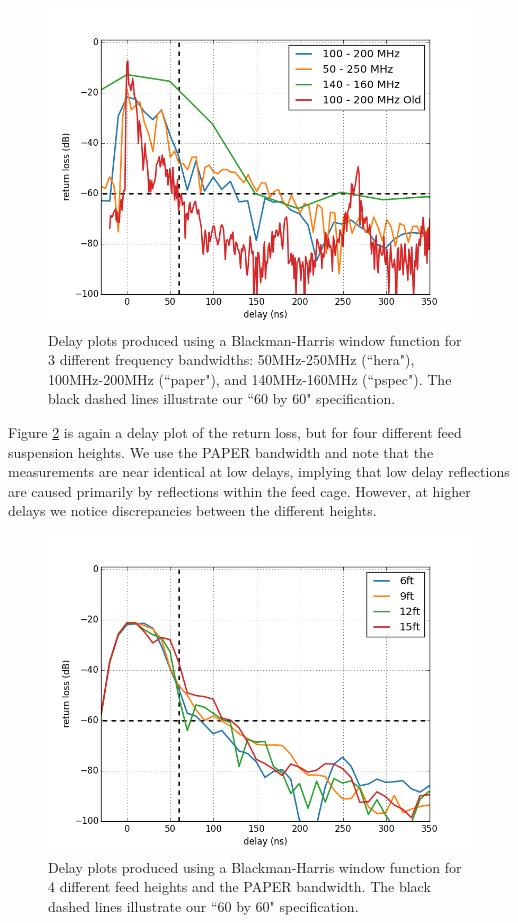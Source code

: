 \documentclass[12pt,preprint]{aastex}
\begin{document}
\begin{figure}
\centering
\includegraphics[totalheight=0.4\textheight]{plots/delay3_window.png}
\caption{Delay plots produced using a Blackman-Harris window function for 3 different frequency bandwidths: 50MHz-250MHz (``hera"), 100MHz-200MHz (``paper"), and 140MHz-160MHz (``pspec"). The black dashed lines illustrate our ``60 by 60" specification.}
\label{fig:3bands}
\end{figure}

Figure \ref{fig:elevator} is again a delay plot of the return loss, but for four different feed suspension heights. We use the PAPER bandwidth and note that the measurements are near identical at low delays, implying that low delay reflections are caused primarily by reflections within the feed cage. However, at higher delays we notice discrepancies between the different heights.

\begin{figure}
\centering
\includegraphics[totalheight=0.4\textheight]{plots/delay_heights_paper.png}
\caption{Delay plots produced using a Blackman-Harris window function for 4 different feed heights and the PAPER bandwidth. The black dashed lines illustrate our ``60 by 60" specification.}
\label{fig:elevator}
\end{figure}
\end{document}
